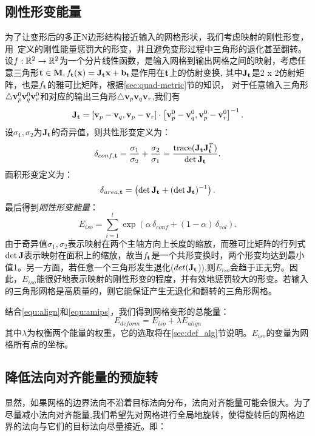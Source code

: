 \subsection{刚性形变能量} \label{sec:egy_amips}
为了让变形后的多正N边形结构接近输入的网格形状，我们考虑映射的刚性形变，用~\cite{Fu2015}定义的刚性能量惩罚大的形变，并且避免变形过程中三角形的退化甚至翻转。设$f:\mathbb{R}^{2}\rightarrow\mathbb{R}^2$为一个分片线性函数，是输入网格到输出网格之间的映射，考虑任意三角形$\mathbf{t} \in \mathbf{M}, f_{\mathbf{t}} (\mathbf{x}) = \mathbf{J}_{\mathbf{t}} \mathbf{x} + \mathbf{b}_{\mathbf{t}}$是作用在$\mathbf{t}$上的仿射变换, 其中$\mathbf{J}_{\mathbf{t}}$是2 x 2仿射矩阵，也是$f_{\mathbf{t}}$的雅可比矩阵，根据\ref{sec:quad-metric}节的知识，
对于任意输入三角形$\triangle \mathbf{v}^0_p\mathbf{v}^0_q\mathbf{v}^0_r$和对应的输出三角形$\triangle \mathbf{v}_p\mathbf{v}_q\mathbf{v}_r$,我们有
\begin{equation}
\mathbf{J}_{\mathbf{t}} = \left[\mathbf{v}_p-\mathbf{v}_q , \mathbf{v}_p-\mathbf{v}_r \right] \cdot \left[\mathbf{v}^0_p-\mathbf{v}^0_q , \mathbf{v}^0_p-\mathbf{v}^0_r \right]^{-1}.
\end{equation}
设$\sigma_{1},\sigma_{2}$为$\mathbf{J}_{\mathbf{t}}$的奇异值，则共性形变定义为：
\begin{equation}
\delta_{conf,\mathbf{t}} = \frac{\sigma_{1}}{\sigma_{2}} + \frac{\sigma_{2}}{\sigma_{1}} = \frac{\operatorname*{trace}(\mathbf{J}_{\mathbf{t}} \mathbf{J}_{\mathbf{t}} ^T)}{\det \mathbf{J}_{\mathbf{t}}} .
\end{equation}
面积形变定义为：
\begin{equation}
\delta_{area,\mathbf{t}} = \left(\det \mathbf{J}_{\mathbf{t}} + (\det \mathbf{J}_{\mathbf{t}})^{-1} \right).
\end{equation}
最后得到\emph{刚性形变能量}：
\begin{equation} \label{equ:amips}
E_{iso} = \sum_{i=1}^l \exp \left(\alpha \, \delta_{conf} + (1-\alpha) \, \delta_{vol} \right).
\end{equation}
由于奇异值$\sigma_{1},\sigma_{2}$表示映射在两个主轴方向上长度的缩放，而雅可比矩阵的行列式$\det \mathbf{J}$表示映射在面积上的缩放，故当$f_{\mathbf{t}}$是一个共形变换时，两个形变均达到最小值1。另一方面，若任意一个三角形发生退化($det(\mathbf{J}_{\mathbf{t}}$)),则$E_{iso}$会趋于正无穷。因此，$E_{iso}$能很好地表示映射的刚性形变的程度，并有效地惩罚较大的形变。若输入的三角形网格是高质量的，则它能保证产生无退化和翻转的三角形网格。

结合\ref{equ:align}和\ref{equ:amips}，我们得到网格变形的总能量：
\begin{equation}\label{equ:deform}
E_{deform}=E_{iso}+\lambda E_{align}
\end{equation}
其中$\lambda$为权衡两个能量的权重，它的选取将在\ref{sec:def_alg}节说明。$E_{iso}$的变量为网格所有点的坐标。
\subsection{降低法向对齐能量的预旋转} \label{sec:efyalignaxis}
显然，如果网格的边界法向不沿着目标法向分布，法向对齐能量可能会很大。为了尽量减小法向对齐能量,我们希望先对网格进行全局地旋转，使得旋转后的网格边界的法向与它们的目标法向尽量接近。即：

